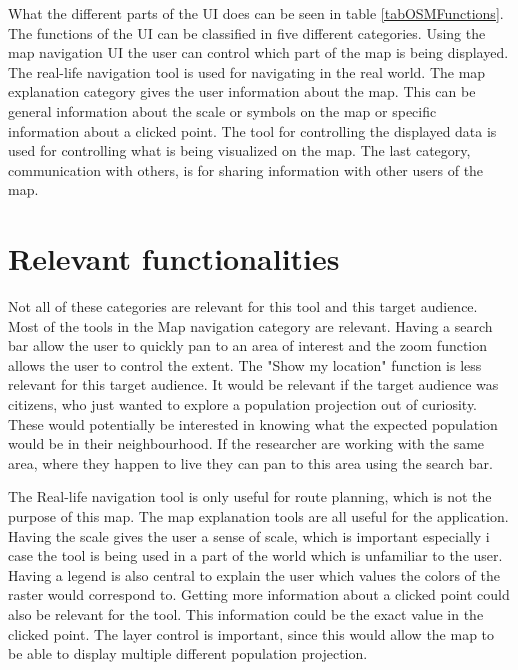 What the different parts of the UI does can be seen in table \ref{tabOSMFunctions}. The functions of the UI can be classified in five different categories. Using the map navigation UI the user can control which part of the map is being displayed.
The real-life navigation tool is used for navigating in the real world. 
The map explanation category gives the user information about the map. This can be general information about the scale or symbols on the map or specific information about a clicked point. 
The tool for controlling the displayed data is used for controlling what is being visualized on the map.
The last category, communication with others, is for sharing information with other users of the map. 

\section{Relevant functionalities}\label{SortingFunctions}

Not all of these categories are relevant for this tool and this target audience. Most of the tools in the Map navigation category are relevant. Having a search bar allow the user to quickly pan to an area of interest and the zoom function allows the user to control the extent. The "Show my location" function is less relevant for this target audience. It would be relevant if the target audience was citizens, who just wanted to explore a population projection out of curiosity. These would potentially be interested in knowing what the expected population would be in their neighbourhood. If the researcher are working with the same area, where they happen to live they can pan to this area using the search bar. 

The Real-life navigation tool is only useful for route planning, which is not the purpose of this map. The map explanation tools are all useful for the application. Having the scale gives the user a sense of scale, which is important especially i case the tool is being used in a part of the world which is unfamiliar to the user. Having a legend is also central to explain the user which values the colors of the raster would correspond to. Getting more information about a clicked point could also be relevant for the tool. This information could be the exact value in the clicked point. The layer control is important, since this would allow the map to be able to display multiple different population projection.

